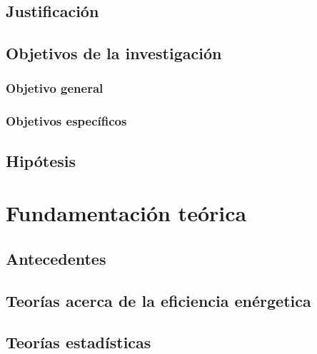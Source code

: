 \documentclass[12pt,letterpaper]{report}
\begin{document}
\newpage
\section{Justificación}

\section{Objetivos de la investigación}

\subsection{Objetivo general}
\subsection{Objetivos específicos}

\section{Hipótesis}

\chapter{Fundamentación teórica}
\section{Antecedentes}
\section{Teorías acerca de la eficiencia enérgetica}
\section{Teorías estadísticas}
\end{document}
